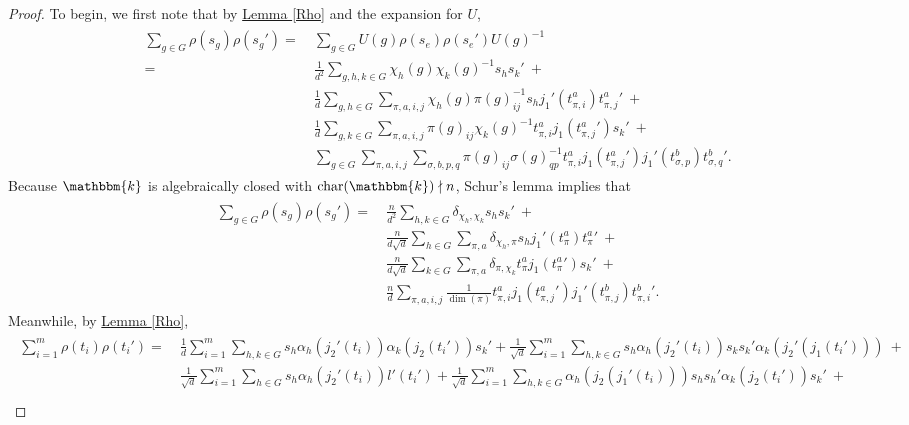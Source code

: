 \noindent\begin{proof} To begin, we first note that by \hyperref[Rho]{Lemma \ref*{Rho}} and the expansion for $U$,
\begin{align*}
\begin{split}
\sum_{g \in G}\rho(s_g)\rho(s_g') =\ &\sum_{g \in G} U(g)\rho(s_e)\rho(s_e')U(g)^{-1}\\
=\ &\frac{1}{d^2}\sum_{g,h,k \in G} \chi_h(g)\chi_k(g)^{-1} s_hs_k'\ +\\
&\frac{1}{d}\sum_{g,h \in G}\sum_{\pi,a,i,j} \chi_h(g)\pi(g)_{ij}^{-1} s_hj_1'(t_{\pi,i}^a){t_{\pi,j}^a}'\ +\\
&\frac{1}{d}\sum_{g,k \in G}\sum_{\pi,a,i,j} \pi(g)_{ij}\chi_k(g)^{-1} t_{\pi,i}^aj_1({t_{\pi,j}^a}')s_k'\ +\\
&\sum_{g \in G}\sum_{\pi,a,i,j}\sum_{\sigma,b,p,q} \pi(g)_{ij}\sigma(g)_{qp}^{-1} t_{\pi,i}^aj_1({t_{\pi,j}^a}')j_1'(t_{\sigma,p}^b){t_{\sigma,q}^b}'.
\end{split}
\end{align*}
\noindent Because $\mathbbm{k}$ is algebraically closed with $\textup{char}(\mathbbm{k}) \nmid n$, Schur's lemma implies that %
\begin{align*}
\begin{split}
\sum_{g \in G}\rho(s_g)\rho(s_g') =\ &\frac{n}{d^2}\sum_{h,k \in G} \delta_{\chi_h,\chi_k} s_hs_k'\ +\\
&\frac{n}{d\sqrt{d}}\sum_{h \in G}\sum_{\pi,a} \delta_{\chi_h,\pi} s_hj_1'(t_{\pi}^a){t_{\pi}^a}'\ +\\
&\frac{n}{d\sqrt{d}}\sum_{k \in G}\sum_{\pi,a} \delta_{\pi,\chi_k} t_{\pi}^aj_1({t_{\pi}^a}')s_k'\ +\\
&\frac{n}{d}\sum_{\pi,a,i,j} \frac{1}{\dim(\pi)}t_{\pi,i}^aj_1({t_{\pi,j}^a}')j_1'(t_{\pi,j}^b){t_{\pi,i}^b}'.
\end{split}
\end{align*}
\noindent Meanwhile, by \hyperref[Rho]{Lemma \ref*{Rho}},
\begin{align*}
\begin{split}
\sum_{i = 1}^m\rho(t_i)\rho(t_i') =\ &\frac{1}{d}\sum_{i = 1}^m\sum_{h,k\in G}s_h\alpha_h(j_2'(t_i))\alpha_k(j_2(t_i'))s_k' + \frac{1}{\sqrt{d}}\sum_{i = 1}^m\sum_{h,k\in G}s_h\alpha_h(j_2'(t_i))s_ks_k'\alpha_k(j_2'(j_1(t_i')))\ +\\
&\frac{1}{\sqrt{d}}\sum_{i = 1}^m\sum_{h\in G}s_h\alpha_h(j_2'(t_i))l'(t_i') + \frac{1}{\sqrt{d}}\sum_{i = 1}^m\sum_{h,k\in G}\alpha_h(j_2(j_1'(t_i)))s_hs_h'\alpha_k(j_2(t_i'))s_k'\ +\\

\end{split}
\end{align*}
\end{proof}
